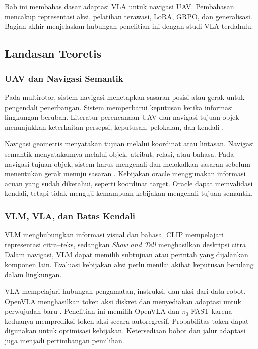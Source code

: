 \chapter{\babDua}
\label{cha:studiliteratur}
Bab ini membahas dasar adaptasi VLA untuk navigasi UAV. Pembahasan mencakup representasi aksi, pelatihan terawasi, LoRA, GRPO, dan generalisasi. Bagian akhir menjelaskan hubungan penelitian ini dengan studi VLA terdahulu.

\section{Landasan Teoretis}
\label{sec:landasan_teori}
\subsection{UAV dan Navigasi Semantik}
\label{subsec:uav_navigasi}
Pada multirotor, sistem navigasi menetapkan sasaran posisi atau gerak untuk pengendali penerbangan. Sistem memperbarui keputusan ketika informasi lingkungan berubah. Literatur perencanaan UAV dan navigasi tujuan-objek menunjukkan keterkaitan persepsi, keputusan, pelokalan, dan kendali \citep{vivaldini2025decision,ayala2024uav}. %

Navigasi geometris menyatakan tujuan melalui koordinat atau lintasan. Navigasi semantik menyatakannya melalui objek, atribut, relasi, atau bahasa. Pada navigasi tujuan-objek, sistem harus mengenali dan melokalkan sasaran sebelum menentukan gerak menuju sasaran \citep{ayala2024uav}. Kebijakan oracle menggunakan informasi acuan yang sudah diketahui, seperti koordinat target. Oracle dapat memvalidasi kendali, tetapi tidak menguji kemampuan kebijakan mengenali tujuan semantik. %

\subsection{VLM, VLA, dan Batas Kendali}
\label{subsec:vlm}
VLM menghubungkan informasi visual dan bahasa. CLIP mempelajari representasi citra--teks, sedangkan \textit{Show and Tell} menghasilkan deskripsi citra \citep{radford2021clip,vinyals2015show}. Dalam navigasi, VLM dapat memilih subtujuan atau perintah yang dijalankan komponen lain. Evaluasi kebijakan aksi perlu menilai akibat keputusan berulang dalam lingkungan. %

\label{subsec:vla}
VLA mempelajari hubungan pengamatan, instruksi, dan aksi dari data robot. OpenVLA menghasilkan token aksi diskret dan menyediakan adaptasi untuk perwujudan baru \citep{kim2024openvla}. Penelitian ini memilih OpenVLA dan $\pi_0$-FAST karena keduanya memprediksi token aksi secara autoregresif. Probabilitas token dapat digunakan untuk optimisasi kebijakan. Ketersediaan bobot dan jalur adaptasi juga menjadi pertimbangan pemilihan.

